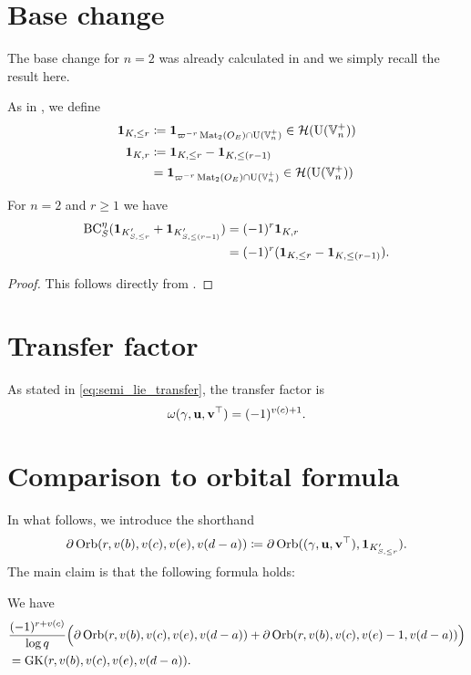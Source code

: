 \section{Base change}
\label{sec:finale_base_change}
The base change for $n=2$ was already calculated in \cite{ref:AFLspherical}
and we simply recall the result here.

As in , we define
\begin{align*}
  \mathbf{1}_{K, \le r} &\coloneqq \mathbf{1}_{\varpi^{-r} \operatorname{Mat}_2(O_E) \cap \operatorname{U}(\mathbb V_n^+)} \in \mathcal H(\operatorname{U}(\mathbb V_n^+)) \\
  \mathbf{1}_{K, r} &\coloneqq \mathbf{1}_{K, \le r} - \mathbf{1}_{K, \le (r-1)} \\
  &= \mathbf{1}_{\varpi^{-r} \operatorname{Mat}_2(O_E) \cap \operatorname{U}(\mathbb V_n^+)} \in \mathcal H(\operatorname{U}(\mathbb V_n^+)) \\
\end{align*}

\begin{lemma}
  \label{lem:finale_base_change}
  For $n = 2$ and $r \ge 1$ we have
  \begin{align*}
    \operatorname{BC}_S^{\eta}(
      \mathbf{1}_{K'_{S, \le r}}
      + \mathbf{1}_{K'_{S, \le (r-1)}}
      )
      &= (-1)^r \mathbf{1}_{K, r} \\
      &= (-1)^r(\mathbf{1}_{K, \le r} - \mathbf{1}_{K, \le (r-1)}).
  \end{align*}
\end{lemma}
\begin{proof}
  This follows directly from \cite[Equation (7.1.9)]{ref:AFLspherical}.
\end{proof}

\section{Transfer factor}
As stated in \eqref{eq:semi_lie_transfer}, the transfer factor is
\[ \omega{(\gamma, \mathbf u, \mathbf v^\top)} = (-1)^{v(c)+1}. \]

\section{Comparison to orbital formula}
In what follows, we introduce the shorthand
\[ \partial\operatorname{Orb}(r, v(b), v(c), v(e), v(d-a))
  \coloneqq \partial \operatorname{Orb}({(\gamma, \mathbf u, \mathbf v^\top)}, \mathbf{1}_{K'_{S, \le r}}). \]
The main claim is that the following formula holds:
\begin{theorem}
  \label{thm:miracle}
  We have
  \begin{align*}
    &\frac{(-1)^{r+v(c)}}{\log q}\Big(\partial\operatorname{Orb}(r, v(b), v(c), v(e), v(d-a))
      + \partial\operatorname{Orb}(r, v(b), v(c), v(e)-1, v(d-a))\Big) \\
    &= \operatorname{GK}(r, v(b), v(c), v(e), v(d-a)).
  \end{align*}
\end{theorem}

